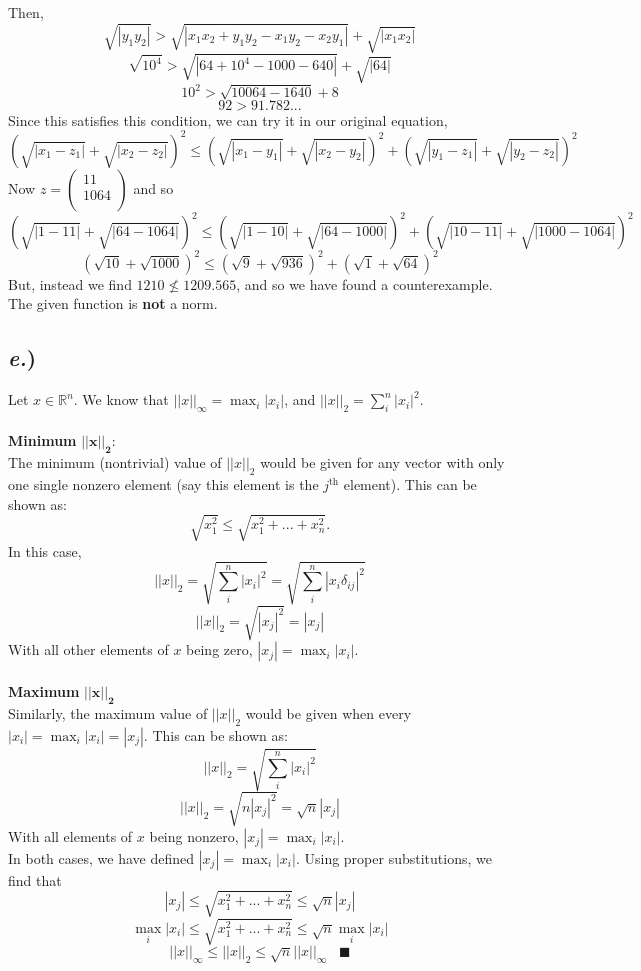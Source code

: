 \documentclass{report}
\begin{document}
Then, 
$$ \sqrt{|y_1 y_2|} > \sqrt{|x_1 x_2 + y_1 y_2 - x_1 y_2 - x_2 y_1 |} + \sqrt{|x_1 x_2|}$$
$$ \sqrt{10^4} > \sqrt{|64 + 10^4 - 1000 - 640 |} + \sqrt{|64|}$$
$$ 10^2 > \sqrt{10064-1640} + 8$$
$$ 92 > 91.782...$$
Since this satisfies this condition, we can try it in our original equation,
$$ (\sqrt{|x_1-z_1|} + \sqrt{|x_2-z_2|})^2 \leq (\sqrt{|x_1-y_1|} + \sqrt{|x_2-y_2|})^2 + (\sqrt{|y_1-z_1|} + \sqrt{|y_2-z_2|})^2 $$
Now
$ z =
\begin{pmatrix}
11\\
1064\\
\end{pmatrix}$
and so 
$$ (\sqrt{|1-11|} + \sqrt{|64-1064|})^2 \leq (\sqrt{|1-10|} + \sqrt{|64-1000|})^2 + (\sqrt{|10-11|} + \sqrt{|1000-1064|})^2 $$
$$ (\sqrt{10} + \sqrt{1000})^2 \leq (\sqrt{9} + \sqrt{936})^2 + (\sqrt{1} + \sqrt{64})^2 $$
But, instead we find $ 1210 \nleq 1209.565 $, and so we have found a counterexample. The given function is \textbf{not} a norm.

\subsection*{\textit{e.})}

Let $x \in \mathbb{R}^n$. We know that $||x||_\infty = \max_i{|x_i|}$, and $||x||_2 = \sum_i^n{|x_i|^2}$. \\
\-\\
\textbf{Minimum }$\bm{||x||_2}:$\\
The minimum (nontrivial) value of $||x||_2$ would be given for any vector with only one single nonzero element (say this element is the $j^{\text{th}}$ element). This can be shown as:
$$ \sqrt{x_1^2} \leq \sqrt{x_1^2 + ... + x_n^2}.$$
In this case, 
$$ ||x||_2 = \sqrt{\sum_i^n{|x_i|^2}} = \sqrt{\sum_i^n{|x_i \delta_{ij}|^2}} $$
$$ ||x||_2 = \sqrt{|x_j|^2} = |x_j| $$
With all other elements of $x$ being zero, $|x_j| = \max_i{|x_i|}$.\\
\-\\
\textbf{Maximum }$\bm{||x||_2}$ \\
Similarly, the maximum value of $||x||_2$ would be given when every $|x_i| = \max_i{|x_i|} = |x_j|$. This can be shown as:
$$ ||x||_2 = \sqrt{\sum_i^n{|x_i|^2}} $$
$$ ||x||_2 =  \sqrt{n|x_j|^2} = \sqrt{n}|x_j| $$ 
With all elements of $x$ being nonzero, $|x_j| = \max_i{|x_i|}$.\\

In both cases, we have defined $|x_j| = \max_i{|x_i|}$. 
Using proper substitutions, we find that 
$$ |x_j| \leq \sqrt{x_1^2 + ... + x_n^2} \leq \sqrt{n}|x_j|$$
$$ \max_i{|x_i|} \leq \sqrt{x_1^2 + ... + x_n^2} \leq \sqrt{n}\max_i{|x_i|}$$
$$ ||x||_\infty \leq ||x||_2 \leq \sqrt{n}||x||_\infty \;\;\; \blacksquare $$
\end{document}
